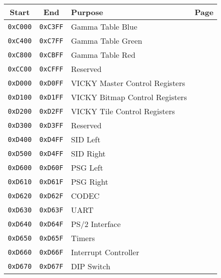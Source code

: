 \begin{table}[ht]
    \begin{center}
        \begin{tabular}{|c|c|l|l|} \hline
            Start & End & Purpose & Page \\ \hline \hline
            \verb+0xC000+ & \verb+0xC3FF+ & Gamma Table Blue & \multirow{3}{*}{\pageref{sec:gamma}} \\ \cline{1-3}
            \verb+0xC400+ & \verb+0xC7FF+ & Gamma Table Green & \\ \cline{1-3}
            \verb+0xC800+ & \verb+0xCBFF+ & Gamma Table Red & \\ \hline
            \verb+0xCC00+ & \verb+0xCFFF+ & Reserved & \\ \hline
            \verb+0xD000+ & \verb+0xD0FF+ & VICKY Master Control Registers & \pageref{tab:vky_master_ctrl_reg}\\ \hline
            \verb+0xD100+ & \verb+0xD1FF+ & VICKY Bitmap Control Registers & \pageref{tab:bm_registers} \\ \hline
            \verb+0xD200+ & \verb+0xD2FF+ & VICKY Tile Control Registers & \pageref{tab:tilemap_reg} \\ \hline
            \verb+0xD300+ & \verb+0xD3FF+ & Reserved & \\ \hline
            \verb+0xD400+ & \verb+0xD4FF+ & SID Left & \multirow{2}{*}{\pageref{tab:sid_registers}} \\ \cline{1-3}
            \verb+0xD500+ & \verb+0xD4FF+ & SID Right & \\ \hline
            \verb+0xD600+ & \verb+0xD60F+ & PSG Left & \multirow{2}{*}{\pageref{tab:psg_registers}} \\ \cline{1-3}
            \verb+0xD610+ & \verb+0xD61F+ & PSG Right & \\ \hline
            \verb+0xD620+ & \verb+0xD62F+ & CODEC & \pageref{tab:codec_registers} \\ \hline
            \verb+0xD630+ & \verb+0xD63F+ & UART & \pageref{tab:uart_reg} \\ \hline
            \verb+0xD640+ & \verb+0xD64F+ & PS/2 Interface & \pageref{tab:ps2_reg} \\ \hline
            \verb+0xD650+ & \verb+0xD65F+ & Timers & \pageref{tab:timer_reg} \\ \hline
            \verb+0xD660+ & \verb+0xD66F+ & Interrupt Controller & \pageref{tab:interrupts} \\ \hline
            \verb+0xD670+ & \verb+0xD67F+ & DIP Switch & \pageref{tab:dip_reg} \\ \hline

\end{tabular}
\end{center}
\end{table}
